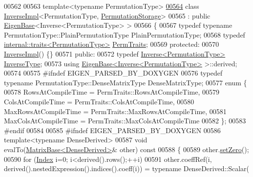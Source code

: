 \begin{DoxyCode}
00562 
00563 \textcolor{keyword}{template}<\textcolor{keyword}{typename} PermutationType>
\hyperlink{class_eigen_1_1_inverse_impl_3_01_permutation_type_00_01_permutation_storage_01_4}{00564} \textcolor{keyword}{class }\hyperlink{class_eigen_1_1_inverse_impl}{InverseImpl}<PermutationType, \hyperlink{struct_eigen_1_1_permutation_storage}{PermutationStorage}>
00565   : \textcolor{keyword}{public} \hyperlink{group___core___module_struct_eigen_1_1_eigen_base}{EigenBase}<Inverse<PermutationType> >
00566 \{
00567     \textcolor{keyword}{typedef} \textcolor{keyword}{typename} PermutationType::PlainPermutationType PlainPermutationType;
00568     \textcolor{keyword}{typedef} \hyperlink{struct_eigen_1_1internal_1_1traits}{internal::traits<PermutationType>} 
      \hyperlink{struct_eigen_1_1internal_1_1traits}{PermTraits};
00569   \textcolor{keyword}{protected}:
00570     \hyperlink{class_eigen_1_1_inverse_impl}{InverseImpl}() \{\}
00571   \textcolor{keyword}{public}:
00572     \textcolor{keyword}{typedef} \hyperlink{class_eigen_1_1_inverse}{Inverse<PermutationType>} \hyperlink{class_eigen_1_1_inverse}{InverseType};
00573     \textcolor{keyword}{using} \hyperlink{group___core___module_struct_eigen_1_1_eigen_base}{EigenBase<Inverse<PermutationType>} >::derived;
00574 
00575 \textcolor{preprocessor}{    #ifndef EIGEN\_PARSED\_BY\_DOXYGEN}
00576     \textcolor{keyword}{typedef} \textcolor{keyword}{typename} PermutationType::DenseMatrixType DenseMatrixType;
00577     \textcolor{keyword}{enum} \{
00578       RowsAtCompileTime = PermTraits::RowsAtCompileTime,
00579       ColsAtCompileTime = PermTraits::ColsAtCompileTime,
00580       MaxRowsAtCompileTime = PermTraits::MaxRowsAtCompileTime,
00581       MaxColsAtCompileTime = PermTraits::MaxColsAtCompileTime
00582     \};
00583 \textcolor{preprocessor}{    #endif}
00584 
00585 \textcolor{preprocessor}{    #ifndef EIGEN\_PARSED\_BY\_DOXYGEN}
00586     \textcolor{keyword}{template}<\textcolor{keyword}{typename} DenseDerived>
00587     \textcolor{keywordtype}{void} evalTo(\hyperlink{group___core___module_class_eigen_1_1_matrix_base}{MatrixBase<DenseDerived>}& other)\textcolor{keyword}{ const}
00588 \textcolor{keyword}{    }\{
00589       other.\hyperlink{group___core___module_ac74411ddeea2545bf20baf14613be47e}{setZero}();
00590       \textcolor{keywordflow}{for} (\hyperlink{group___core___module_a554f30542cc2316add4b1ea0a492ff02}{Index} i=0; i<derived().rows();++i)
00591         other.coeffRef(i, derived().nestedExpression().indices().coeff(i)) = \textcolor{keyword}{typename} DenseDerived::Scalar(

\end{DoxyCode}

